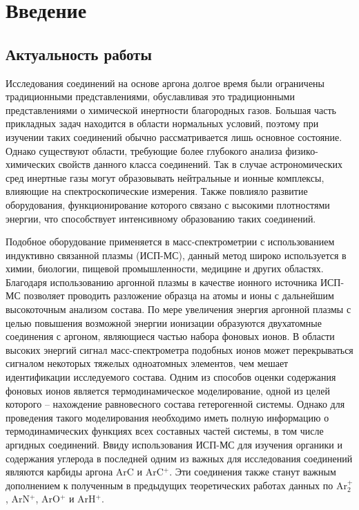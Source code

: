 \documentclass[12pt]{extarticle}
\begin{document}
    \tableofcontents{}
    \newpage

    \section{Введение}
    
    \subsection{Актуальность работы}
    \label{sec:Chapter0.1}
    
    Исследования соединений на основе аргона долгое время были ограничены традиционными представлениями, обуславливая это традиционными представлениями о химической инертности благородных газов. Большая часть прикладных задач находится в области нормальных условий, поэтому при изучении таких соединений обычно рассматривается лишь основное состояние. Однако существуют области, требующие более глубокого анализа физико-химических свойств данного класса соединений. Так в случае астрономических сред инертные газы могут образовывать нейтральные и ионные комплексы, влияющие на спектроскопические измерения. Также повлияло развитие оборудования, функционирование которого связано с высокими плотностями энергии, что способствует интенсивному образованию таких соединений.
    
    Подобное оборудование применяется в масс-спектрометрии с использованием индуктивно связанной плазмы (ИСП-МС), данный метод широко используется в химии, биологии, пищевой промышленности, медицине и других областях. Благодаря использованию аргонной плазмы в качестве ионного источника ИСП-МС позволяет проводить разложение образца на атомы и ионы с дальнейшим высокоточным анализом состава. По мере увеличения энергия аргонной плазмы с целью повышения возможной энергии ионизации образуются двухатомные соединения с аргоном, являющиеся частью набора фоновых ионов. В области высоких энергий сигнал масс-спектрометра подобных ионов может перекрываться сигналом некоторых тяжелых одноатомных элементов, чем мешает идентификации исследуемого состава. Одним из способов оценки содержания фоновых ионов является термодинамическое моделирование, одной из целей которого -- нахождение равновесного состава гетерогенной системы. Однако для проведения такого моделирования необходимо иметь полную информацию о термодинамических функциях всех составных частей системы, в том числе аргидных соединений. Ввиду использования ИСП-МС для изучения органики и содержания углерода в последней одним из важных для исследования соединений являются карбиды аргона ArC и ArC$^+$. Эти соединения также станут важным дополнением к полученным в предыдущих теоретических работах данных по Ar$_2^+$, ArN$^+$, ArO$^+$ и ArH$^+$.
    
\end{document}
